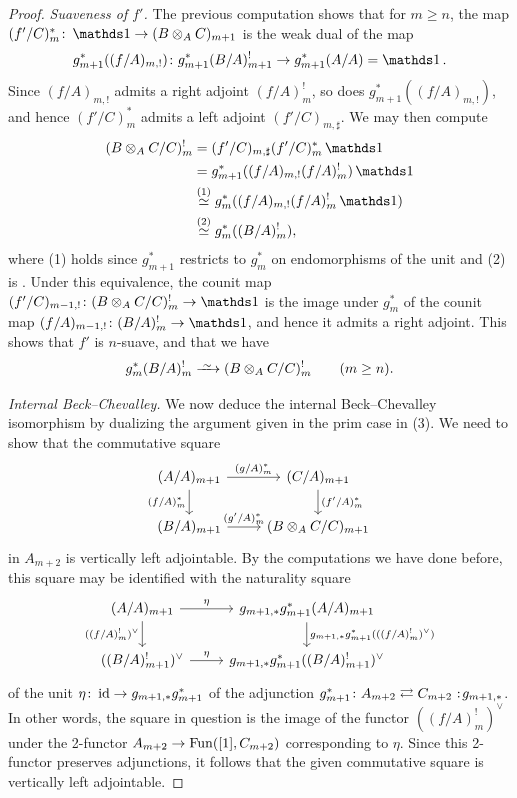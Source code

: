 \documentclass[11pt]{book}
\begin{document}
\begin{proof}
		\emph{Suaveness of $f'$.} The previous computation shows that for $m \geq n$, the map $(f'/C)^*_{m}\colon \unit \to (B \otimes_A C)_{m+1}$ is the weak dual of the map
		\[
			g_{m+1}^*((f/A)_{m,!})\colon g_{m+1}^*(B/A)^!_{m+1} \to g_{m+1}^*(A/A) = \unit.
		\]
		Since $(f/A)_{m,!}$ admits a right adjoint $(f/A)^!_m$, so does $g_{m+1}^*((f/A)_{m,!})$, and hence $(f'/C)^*_{m}$ admits a left adjoint $(f'/C)_{m,\sharp}$. We may then compute
		\begin{align*}
			(B \otimes_A C/C)^!_m &= (f'/C)_{m,\sharp}(f'/C)^*_{m}\unit \\
			&= g_{m+1}^*((f/A)_{m,!}(f/A)^!_{m})\unit \\
			&\overset{(1)}{\simeq} g_{m}^*((f/A)_{m,!}(f/A)^!_{m}\unit) \\
			&\overset{(2)}{\simeq} g_m^*((B/A)^!_m),
		\end{align*}
		where (1) holds since $g_{m+1}^*$ restricts to $g_m^*$ on endomorphisms of the unit and (2) is . Under this equivalence, the counit map $(f'/C)_{m-1,!}\colon (B \otimes_A C/C)^!_m \to \unit$ is the image under $g_m^*$ of the counit map $(f/A)_{m-1,!}\colon (B/A)^!_m \to \unit$, and hence it admits a right adjoint. This shows that $f'$ is $n$-suave, and that we have
		\[
			g^*_m(B/A)^!_m \iso (B \otimes_A C/C)^!_m \qquad (m \geq n).
		\]

		\emph{Internal Beck--Chevalley.} We now deduce the internal Beck--Chevalley isomorphism by dualizing the argument given in the prim case in (3). We need to show that the commutative square
		\[
		\begin{tikzcd}
			(A/A)_{m+1} \dar[swap]{(f/A)^*_{m}} \rar{(g/A)^*_m} & (C/A)_{m+1} \dar{(f'/A)^*_m} \\
			(B/A)_{m+1} \rar{(g'/A)^*_m} & (B \otimes_A C/C)_{m+1}
		\end{tikzcd}
		\]
		in $A_{m+2}$ is vertically left adjointable. By the computations we have done before, this square may be identified with the naturality square
		\[
		\begin{tikzcd}
			(A/A)_{m+1} \dar[swap]{((f/A)^!_m)^{\vee}} \rar{\eta} & g_{m+1,*}g_{m+1}^*(A/A)_{m+1} \dar{g_{m+1,*}g_{m+1}^*(((f/A)^!_m)^{\vee})} \\
			((B/A)^!_{m+1})^{\vee} \rar{\eta} & g_{m+1,*}g_{m+1}^*((B/A)^!_{m+1})^{\vee}
		\end{tikzcd}
		\]
		of the unit $\eta\colon \operatorname{id} \to g_{m+1,*}g_{m+1}^*$ of the adjunction $g^*_{m+1}\colon A_{m+2} \rightleftarrows C_{m+2} \noloc g_{m+1,*}$. In other words, the square in question is the image of the functor $((f/A)^!_m)^{\vee}$ under the 2-functor $A_{m+2} \to \operatorname{Fun}([1],C_{m+2})$ corresponding to $\eta$. Since this 2-functor preserves adjunctions, it follows that the given commutative square is vertically left adjointable.


\end{proof}
\end{document}
